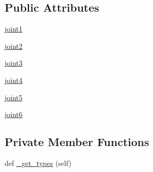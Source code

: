 \subsection*{Public Attributes}
\begin{DoxyCompactItemize}
\item 
\hyperlink{classjaco__msgs_1_1msg_1_1__JointVelocity_1_1JointVelocity_a06dbd96dcbbb6e6dfbf32bd4c091be28}{joint1}
\item 
\hyperlink{classjaco__msgs_1_1msg_1_1__JointVelocity_1_1JointVelocity_ac84aa529e626ac3f579462254fc2a3bb}{joint2}
\item 
\hyperlink{classjaco__msgs_1_1msg_1_1__JointVelocity_1_1JointVelocity_a329d1f63f920e19eadb7d14dff42c27f}{joint3}
\item 
\hyperlink{classjaco__msgs_1_1msg_1_1__JointVelocity_1_1JointVelocity_a6aa007d0062893c6b55567b4df37fabc}{joint4}
\item 
\hyperlink{classjaco__msgs_1_1msg_1_1__JointVelocity_1_1JointVelocity_ab54e9649ee9b5be0a5b79e2e6b02c126}{joint5}
\item 
\hyperlink{classjaco__msgs_1_1msg_1_1__JointVelocity_1_1JointVelocity_a23e291537f4c93aa246efc164af51394}{joint6}
\end{DoxyCompactItemize}
\subsection*{Private Member Functions}
\begin{DoxyCompactItemize}
\item 
def \hyperlink{classjaco__msgs_1_1msg_1_1__JointVelocity_1_1JointVelocity_a6b07f5f8ecdde72812d8097884625624}{\+\_\+get\+\_\+types} (self)
\end{DoxyCompactItemize}
